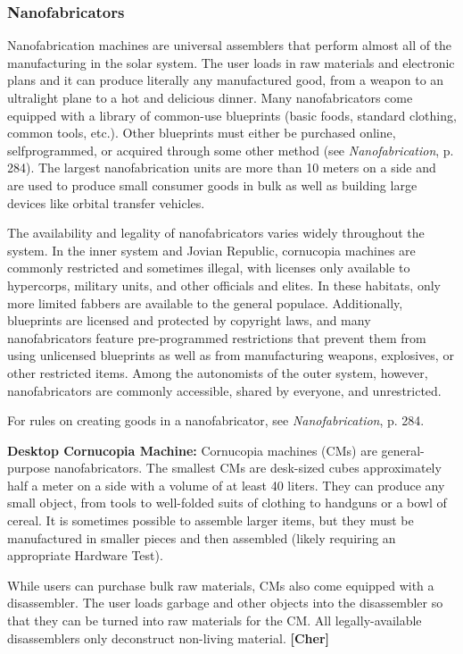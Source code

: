 {{\subsubsection{Nanofabricators} 

Nanofabrication machines are universal assemblers that perform almost all of the manufacturing in the solar system. The user loads in raw materials and electronic plans and it can produce literally any manufactured good, from a weapon to an ultralight plane to a hot and delicious dinner. Many nanofabricators come equipped with a library of common-use blueprints (basic foods, standard clothing, common tools, etc.). Other blueprints must either be purchased online, selfprogrammed, or acquired through some other method (see \emph{Nanofabrication}, p. 284). The largest nanofabrication units are more than 10 meters on a side and are used to produce small consumer goods in bulk as well as building large devices like orbital transfer vehicles. 

The availability and legality of nanofabricators varies widely throughout the system. In the inner system and Jovian Republic, cornucopia machines are commonly restricted and sometimes illegal, with licenses only available to hypercorps, military units, and other officials and elites. In these habitats, only more limited fabbers are available to the general populace. Additionally, blueprints are licensed and protected by copyright laws, and many nanofabricators feature pre-programmed restrictions that prevent them from using unlicensed blueprints as well as from manufacturing weapons, explosives, or other restricted items. Among the autonomists of the outer system, however, nanofabricators are commonly accessible, shared by everyone, and unrestricted. 

For rules on creating goods in a nanofabricator, see \textit{Nanofabrication}, p. 284. 

\textbf{Desktop Cornucopia Machine:} Cornucopia machines (CMs) are general-purpose nanofabricators. The smallest CMs are desk-sized cubes approximately half a meter on a side with a volume of at least 40 liters. They can produce any small object, from tools to well-folded suits of clothing to handguns or a bowl of cereal. It is sometimes possible to assemble larger items, but they must be manufactured in smaller pieces and then assembled (likely requiring an appropriate Hardware Test). 

While users can purchase bulk raw materials, CMs also come equipped with a disassembler. The user loads garbage and other objects into the disassembler so that they can be turned into raw materials for the CM. All legally-available disassemblers only deconstruct non-living material. \textbf{[Cher]} 

}}
